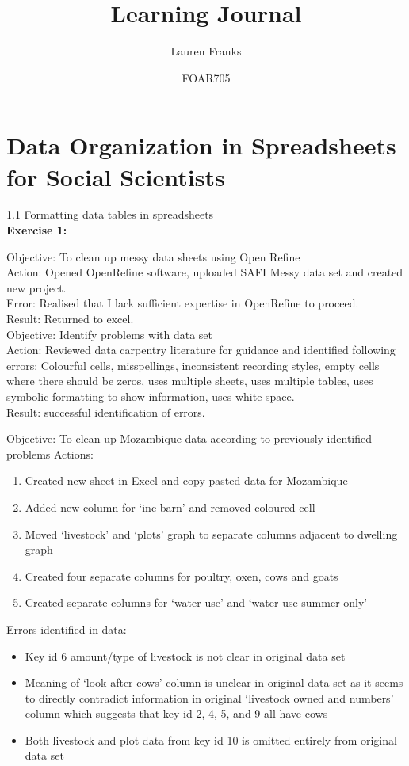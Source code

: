 \documentclass{article}
\title{Learning Journal}
\author{Lauren Franks }
\date{FOAR705}
\newcommand{\chapsubhead}[1]{{\Large #1 \vspace{2ex}}}
\begin{document}
\maketitle
\tableofcontents


\section{Data Organization in Spreadsheets for Social Scientists}
\chapsubhead{1.1 Formatting data tables in spreadsheets}\\
\textbf{Exercise 1:}\newline

Objective: To clean up messy data sheets using Open Refine\\
Action: Opened OpenRefine software, uploaded SAFI Messy data set and created new project.\\
Error: Realised that I lack sufficient expertise in OpenRefine to proceed.\\ 
Result: Returned to excel.\\

Objective: Identify problems with data set\\
Action: Reviewed data carpentry literature for guidance and identified following errors:
Colourful cells, misspellings, inconsistent recording styles, empty cells where there should be zeros, uses multiple sheets, uses multiple tables, uses symbolic formatting to show information, uses white space.\\
Result: successful identification of errors.\newline

Objective: To clean up Mozambique data according to previously identified problems
Actions:
\begin{enumerate}
\item Created new sheet in Excel and copy pasted data for Mozambique
\item Added new column for ‘inc barn’ and removed coloured cell
\item Moved ‘livestock’ and ‘plots’ graph to separate columns adjacent to dwelling graph
\item Created four separate columns for poultry, oxen, cows and goats
\item Created separate columns for ‘water use’ and ‘water use summer only’
\end{enumerate}
Errors identified in data:
\begin{itemize}
\item Key id 6 amount/type of livestock is not clear in original data set
\item Meaning of ‘look after cows’ column is unclear in original data set as it seems to directly contradict information in original ‘livestock owned and numbers’ column which suggests that key id 2, 4, 5, and 9 all have cows
\item Both livestock and plot data from key id 10 is omitted entirely from original data set
\end{itemize}
\end{document}
